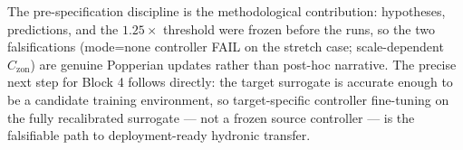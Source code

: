 \documentclass[11pt,a4paper]{article}
\begin{document}
The pre-specification discipline is the methodological contribution: hypotheses, predictions, and the $1.25\times$ threshold were frozen before the runs, so the two falsifications (mode=none controller FAIL on the stretch case; scale-dependent $C_{\mathrm{zon}}$) are genuine Popperian updates rather than post-hoc narrative. The precise next step for Block 4 follows directly: the target surrogate is accurate enough to be a candidate training environment, so target-specific controller fine-tuning on the fully recalibrated surrogate --- not a frozen source controller --- is the falsifiable path to deployment-ready hydronic transfer.
\end{document}
